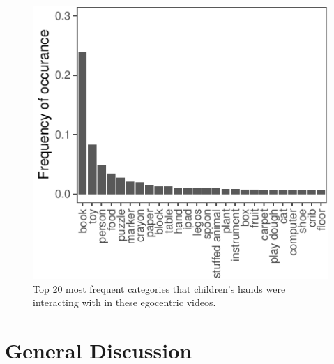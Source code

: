\documentclass[10pt, letterpaper]{article}
\newenvironment{CodeChunk}{}{}
\begin{document}
\begin{CodeChunk}
\begin{figure}[h]

{\centering \includegraphics{figs/freq_interact-1} 

}

\caption[Top 20 most frequent categories that children's hands were interacting with in these egocentric videos]{Top 20 most frequent categories that children's hands were interacting with in these egocentric videos.}\label{fig:freq_interact}
\end{figure}
\end{CodeChunk}

\hypertarget{general-discussion}{%
\section{General Discussion}\label{general-discussion}}
\end{document}
